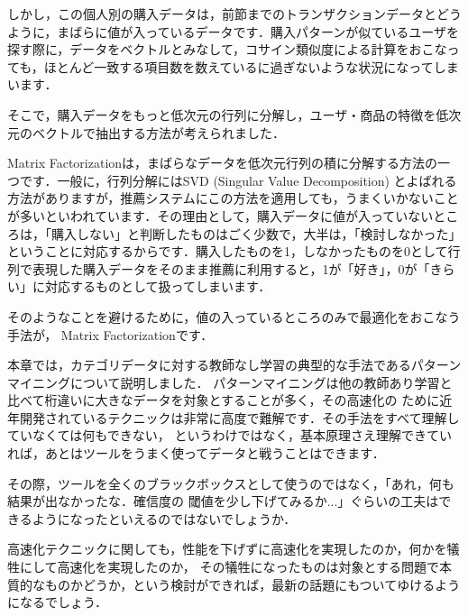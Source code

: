 しかし，この個人別の購入データは，前節までのトランザクションデータとどうように，まばらに値が入っているデータです．購入パターンが似ているユーザを探す際に，データをベクトルとみなして，コサイン類似度による計算をおこなっても，ほとんど一致する項目数を数えているに過ぎないような状況になってしまいます．


そこで，購入データをもっと低次元の行列に分解し，ユーザ・商品の特徴を低次元のベクトルで抽出する方法が考えられました．


Matrix Factorizationは，まばらなデータを低次元行列の積に分解する方法の一つです．一般に，行列分解にはSVD (Singular Value Decomposition) とよばれる方法がありますが，推薦システムにこの方法を適用しても，うまくいかないことが多いといわれています．その理由として，購入データに値が入っていないところは，「購入しない」と判断したものはごく少数で，大半は，「検討しなかった」ということに対応するからです．購入したものを1，しなかったものを0として行列で表現した購入データをそのまま推薦に利用すると，1が「好き」，0が「きらい」に対応するものとして扱ってしまいます．

そのようなことを避けるために，値の入っているところのみで最適化をおこなう手法が，
Matrix Factorizationです．


本章では，カテゴリデータに対する教師なし学習の典型的な手法であるパターンマイニングについて説明しました．
パターンマイニングは他の教師あり学習と比べて桁違いに大きなデータを対象とすることが多く，その高速化の
ために近年開発されているテクニックは非常に高度で難解です．その手法をすべて理解していなくては何もできない，
というわけではなく，基本原理さえ理解できていれば，あとはツールをうまく使ってデータと戦うことはできます．

その際，ツールを全くのブラックボックスとして使うのではなく，「あれ，何も結果が出なかったな．確信度の
閾値を少し下げてみるか...」ぐらいの工夫はできるようになったといえるのではないでしょうか．

高速化テクニックに関しても，性能を下げずに高速化を実現したのか，何かを犠牲にして高速化を実現したのか，
その犠牲になったものは対象とする問題で本質的なものかどうか，という検討ができれば，最新の話題にもついてゆけるようになるでしょう．

